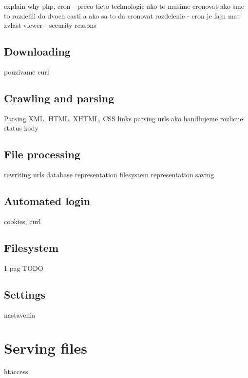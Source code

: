 explain why php, cron - preco tieto technologie
ako to musime cronovat
ako sme to rozdelili do dvoch casti a ako sa to da cronovat
rozdelenie - cron je fajn mat zvlast
viewer - security reasons

\subsection{Downloading}
pouzivame curl

\subsection{Crawling and parsing}
Parsing XML, HTML, XHTML, CSS links
parsing urls
ako handlujeme rozlicne status kody

\subsection{File processing}

rewriting urls
database representation
filesystem representation
saving

\subsection{Automated login}
\label{sec:login}
cookies, curl

\subsection{Filesystem}
\label{sec:filesystem}
1 pag
TODO

\subsection{Settings}
nastavenia

\section{Serving files}
\label{sec:serving}
htaccess
